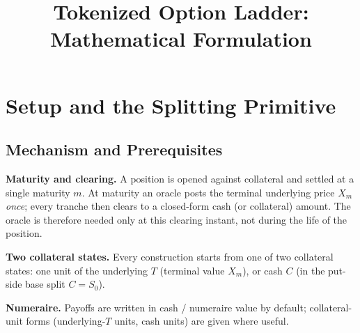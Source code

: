 \documentclass[11pt]{article}
\title{Tokenized Option Ladder: Mathematical Formulation}
\author{}
\date{}
\begin{document}
\maketitle
\vspace{-2em}


\section{Setup and the Splitting Primitive}

\subsection{Mechanism and Prerequisites}

\textbf{Maturity and clearing.} A position is opened against collateral and settled
at a single maturity $m$. At maturity an oracle posts the terminal underlying price
$X_m$ \emph{once}; every tranche then clears to a closed-form cash (or collateral)
amount. The oracle is therefore needed only at this clearing instant, not during the
life of the position.

\textbf{Two collateral states.} Every construction starts from one of two collateral
states: one unit of the underlying $T$ (terminal value $X_m$), or cash $C$ (in the
put-side base split $C=S_0$).

\textbf{Numeraire.} Payoffs are written in cash / numeraire value by default;
collateral-unit forms (underlying-$T$ units, cash units) are given where useful.
\end{document}
